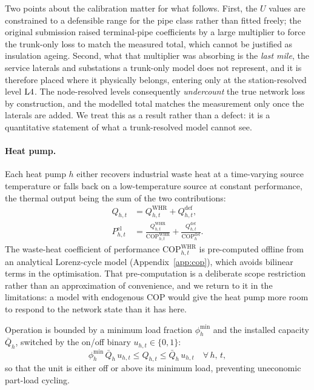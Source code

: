 Two points about the calibration matter for what follows. First, the $U$ values are
constrained to a defensible range for the pipe class rather than fitted freely; the
original submission raised terminal-pipe coefficients by a large multiplier to force the
trunk-only loss to match the measured total, which cannot be justified as insulation
ageing. Second, what that multiplier was absorbing is the \emph{last mile}, the service
laterals and substations a trunk-only model does not represent, and it is therefore
placed where it physically belongs, entering only at the station-resolved level $\mathrm{L4}$.
The node-resolved levels consequently \emph{undercount} the true network loss by
construction, and the modelled total matches the measurement only once the laterals are
added. We treat this as a result rather than a defect: it is a quantitative statement of
what a trunk-resolved model cannot see.

\paragraph{Heat pump.}
Each heat pump $h$ either recovers industrial waste heat at a time-varying source
temperature or falls back on a low-temperature source at constant performance, the
thermal output being the sum of the two contributions:
%
\begin{align}
  Q_{h,t} &= Q_{h,t}^{\mathrm{WHR}} + Q_{h,t}^{\mathrm{def}},
  \label{eq:hp_split} \\[4pt]
  P_{h,t}^{\mathrm{el}} &= \frac{Q_{h,t}^{\mathrm{WHR}}}{
    \mathrm{COP}_{h,t}^{\mathrm{WHR}}}
    + \frac{Q_{h,t}^{\mathrm{def}}}{\mathrm{COP}_h^{\mathrm{def}}}.
  \label{eq:hp_pel}
\end{align}
%
The waste-heat coefficient of performance $\mathrm{COP}_{h,t}^{\mathrm{WHR}}$ is
pre-computed offline from an analytical Lorenz-cycle model
(Appendix~\ref{app:cop}), which avoids bilinear terms in the optimisation. That
pre-computation is a deliberate scope restriction rather than an approximation of
convenience, and we return to it in the limitations: a model with endogenous COP would
give the heat pump more room to respond to the network state than it has here.

Operation is bounded by a minimum load fraction $\phi_h^{\mathrm{min}}$ and the installed
capacity $\bar{Q}_h$, switched by the on/off binary $u_{h,t} \in \{0,1\}$:
%
\begin{equation}
  \phi_h^{\mathrm{min}}\, \bar{Q}_h\, u_{h,t}
  \leq Q_{h,t} \leq \bar{Q}_h\, u_{h,t}
  \quad \forall\, h,\, t,
  \label{eq:hp_cap}
\end{equation}
%
so that the unit is either off or above its minimum load, preventing uneconomic part-load
cycling.

